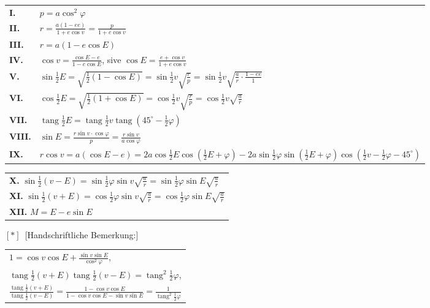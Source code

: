 \documentclass[12pt,a4paper]{book}
\newcommand{\tang}{\operatorname{tang}}
\begin{document}
\begin{center}
\begin{tabular}{@{}ll@{}}
\textbf{I.} & $p=a\cos^{2}\varphi$ \\[1ex]
\textbf{II.} & $r=\frac{a(1-ee)}{1+e\cos v}=\frac{p}{1+e\cos v}$ \\[1ex]
\textbf{III.} & $r=a(1-e\cos E)$ \\[1ex]
\textbf{IV.} & $\cos v=\frac{\cos E-e}{1-e\cos E}$, sive $\cos E=\frac{e+\cos v}{1+e\cos v}$ \\[1ex]
\textbf{V.} & $\sin\tfrac{1}{2}E=\sqrt{\tfrac{1}{2}(1-\cos E)}=\sin\tfrac{1}{2}v\sqrt{\frac{r}{p}}=\sin\tfrac{1}{2}v\sqrt{\frac{a}{r}\cdot\frac{1-ee}{1}}$ \\[1ex]
\textbf{VI.} & $\cos\tfrac{1}{2}E=\sqrt{\tfrac{1}{2}(1+\cos E)}=\cos\tfrac{1}{2}v\sqrt{\frac{r}{p}}=\cos\tfrac{1}{2}v\sqrt{\frac{a}{r}}$ \\[1ex]
\textbf{VII.} & $\tang\tfrac{1}{2}E=\tang\tfrac{1}{2}v\tang(45^{\circ}-\tfrac{1}{2}\varphi)$ \\[1ex]
\textbf{VIII.} & $\sin E=\frac{r\sin v\cdot\cos\varphi}{p}=\frac{r\sin v}{a\cos\varphi}$ \\[1ex]
\textbf{IX.} & $r\cos v=a(\cos E-e)=2a\cos\tfrac{1}{2}E\cos(\tfrac{1}{2}E+\varphi)-2a\sin\tfrac{1}{2}\varphi\sin(\tfrac{1}{2}E+\varphi)\cos(\tfrac{1}{2}v-\tfrac{1}{2}\varphi-45^{\circ})$
\end{tabular}
\end{center}

\begin{center}
\begin{tabular}{@{}l@{}}
\textbf{X.} $\sin\tfrac{1}{2}(v-E)=\sin\tfrac{1}{2}\varphi\sin v\sqrt{\frac{a}{r}}=\sin\tfrac{1}{2}\varphi\sin E\sqrt{\frac{a}{r}}$ \\[1ex]
\textbf{XI.} $\sin\tfrac{1}{2}(v+E)=\cos\tfrac{1}{2}\varphi\sin v\sqrt{\frac{a}{r}}=\cos\tfrac{1}{2}\varphi\sin E\sqrt{\frac{a}{r}}$ \\[1ex]
\textbf{XII.} $M=E-e\sin E$
\end{tabular}
\end{center}

$[*]$\ [Handschriftliche Bemerkung:]

\begin{center}
\begin{tabular}{@{}l@{}}
$1=\cos v\cos E+\frac{\sin v\sin E}{\cos^{2}\varphi}$, \\
$\tang\tfrac{1}{2}(v+E)\tang\tfrac{1}{2}(v-E)=\tang^{2}\tfrac{1}{2}\varphi$, \\
$\frac{\tang\tfrac{1}{2}(v+E)}{\tang\tfrac{1}{2}(v-E)}=\frac{1-\cos v\cos E}{1-\cos v\cos E-\sin v\sin E}=\frac{1}{\tang^{2}\tfrac{1}{2}\varphi}$
\end{tabular}
\end{center}
\end{document}
